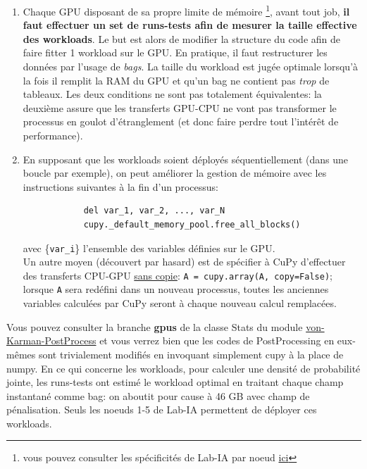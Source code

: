 \documentclass[13pt, a4paper]{extarticle}
\begin{document}
\begin{tcolorbox}[colback=Goldenrod]
\begin{enumerate}
  \item Chaque GPU disposant de sa propre limite de mémoire \footnote{vous pouvez
  consulter les spécificités de Lab-IA par noeud \href{https://lab-ia.fr/specifications/}{ici}},
  avant tout job, {\bf il faut effectuer un set de runs-tests afin de mesurer la taille
  effective des workloads}. Le but est alors de modifier la structure du code
  afin de faire fitter 1 workload sur le GPU. En pratique, il faut restructurer 
  les données par l'usage de \emph{bags}. La taille du workload est jugée optimale
  lorsqu'à la fois il remplit la RAM du GPU et qu'un bag ne contient pas \emph{trop}
  de tableaux. Les deux conditions ne sont pas totalement équivalentes:
  la deuxième assure que les transferts GPU-CPU ne vont pas transformer le processus
  en goulot d'étranglement (et donc faire perdre tout l'intérêt de performance).
  \item En supposant que les workloads soient déployés séquentiellement (dans une boucle
        par exemple), on peut améliorer la gestion de mémoire avec les instructions suivantes
        à la fin d'un processus:
          \begin{verbatim}
            del var_1, var_2, ..., var_N
            cupy._default_memory_pool.free_all_blocks()
          \end{verbatim}
        avec \{\texttt{var\_i}\} l'ensemble des variables définies
        sur le GPU. \\ 
        Un autre moyen (découvert par hasard) est de spécifier 
        à CuPy d'effectuer des transferts CPU-GPU \ul{sans copie}:
        \texttt{A = cupy.array(A, copy=False)}; lorsque \texttt{A} sera redéfini
        dans un nouveau processus, toutes les anciennes variables calculées
        par CuPy seront à chaque nouveau calcul remplacées.
\end{enumerate}
\end{tcolorbox}

\noindent Vous pouvez consulter la branche {\bf gpus} de la classe Stats du module 
\href{https://gitlab.lisn.upsaclay.fr/allaglo/von-karman-postprocess/-/tree/gpu?ref_type=heads}
{von-Karman-PostProcess} et vous verrez bien que les codes de PostProcessing en eux-mêmes
sont trivialement modifiés en invoquant simplement cupy à la place de numpy. 
En ce qui concerne les workloads, pour calculer une densité de probabilité
jointe, les runs-tests ont estimé le workload optimal en traitant chaque champ instantané
comme bag: on aboutit pour cause à 46 GB avec champ de pénalisation. 
Seuls les noeuds 1-5 de Lab-IA permettent de déployer 
ces workloads. 
\end{document}
